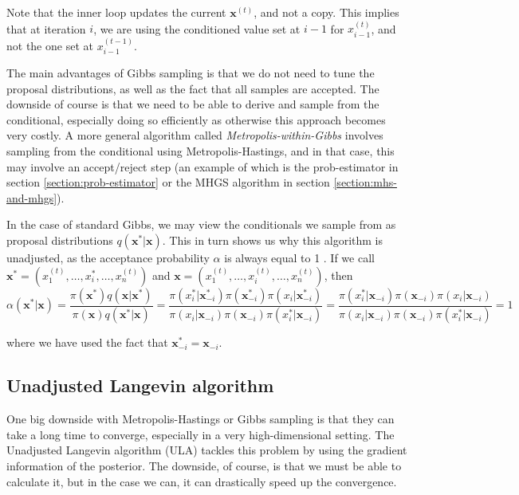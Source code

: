 \documentclass[12pt]{memoir}
\newcommand{\mb}{\mathbf}
\begin{document}
Note that the inner loop updates the current $\mb x^{(t)}$, and not a copy. This implies that at iteration $i$, we are using the conditioned value set at $i-1$ for $x^{(t)}_{i-1}$, and not the one set at $x^{(t-1)}_{i-1}$.\medbreak


The main advantages of Gibbs sampling is that we do not need to tune the proposal distributions, as well as the fact that all samples are accepted. The downside of course is that we need to be able to derive and sample from the conditional, especially doing so efficiently as otherwise this approach becomes very costly. A more general algorithm called \textit{Metropolis-within-Gibbs} involves sampling from the conditional using Metropolis-Hastings, and in that case, this may involve an accept/reject step (an example of which is the prob-estimator in section \ref{section:prob-estimator} or the MHGS algorithm in section \ref{section:mhs-and-mhgs}). \medbreak


In the case of standard Gibbs, we may view the conditionals we sample from as proposal distributions $q(\mb x^*|\mb x)$. This in turn shows us why this algorithm is unadjusted, as the acceptance probability $\alpha$ is always equal to 1 \cite{mcmc:slides:Rigon2024Mar}. If we call $\mb x^* = (x_1^{(t)}, \dots, x_{i}^*, \dots, x^{(t)}_{n})$ and $\mb x = (x_1^{(t)}, \dots, x_{i}^{(t)}, \dots, x^{(t)}_{n})$, then
\begin{equation}
    \alpha(\mb x^*|\mb x) = \frac{\pi(\mb x^*) q(\mb x|\mb x^*)}{\pi(\mb x) q(\mb x^* |\mb x)} = \frac{\pi(x_i^*|\mb x_{-i}^*)\pi(\mb x^*_{-i}) \pi(x_i|\mb x^*_{-i})}{\pi(x_i|\mb x_{-i})\pi(\mb x_{-i}) \pi(x_i^*|\mb x_{-i})} = \frac{\pi( x_i^*|\mb x_{-i})\pi(\mb x_{-i}) \pi(x_i|\mb x_{-i})}{\pi(x_i|\mb x_{-i})\pi(\mb x_{-i}) \pi(x_i^*|\mb x_{-i})} = 1
\end{equation}

where we have used the fact that $\mb x^*_{-i} = \mb x_{-i}$.



\subsection{Unadjusted Langevin algorithm}\label{section:ula}

One big downside with Metropolis-Hastings or Gibbs sampling is that they can take a long time to converge, especially in a very high-dimensional setting. The Unadjusted Langevin algorithm (ULA) tackles this problem by using the gradient information of the posterior. The downside, of course, is that we must be able to calculate it, but in the case we can, it can drastically speed up the convergence.\medbreak
\end{document}
